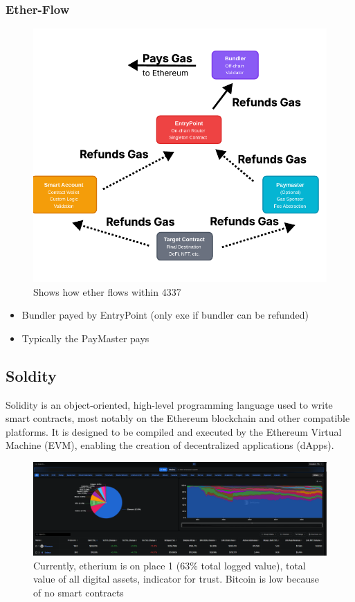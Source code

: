 \documentclass[../Main.tex]{subfiles}
\begin{document}
\subsubsection{Ether-Flow}
\begin{figure}[H]
    \centering
    \includegraphics[width=0.75\linewidth]{Images/blockchain/ether-flow-4337.png}
    \caption{Shows how ether flows within 4337}
\end{figure}
\begin{itemize}
    \item Bundler payed by EntryPoint (only exe if bundler can be refunded)
    \item Typically the PayMaster pays
\end{itemize}

\subsection{Soldity}
Solidity is an object-oriented, high-level programming language used to write smart contracts,
most notably on the Ethereum blockchain and other compatible platforms.
It is designed to be compiled and executed by the Ethereum Virtual Machine (EVM),
enabling the creation of decentralized applications (dApps).

\begin{figure}[H]
    \centering
    \includegraphics[width=0.75\linewidth]{Images/blockchain/defilama-smartcontract-chain.png}
    \caption{Currently, etherium is on place 1 (63\% total logged value), total value of all digital assets, indicator for trust. Bitcoin is low because of no smart contracts}
\end{figure}
\end{document}
